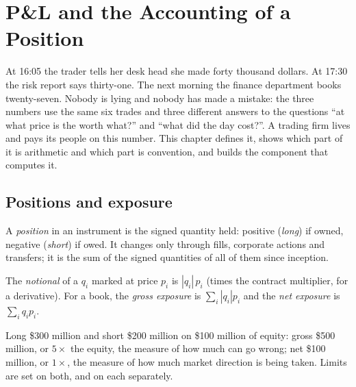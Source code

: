 \chapter{P\&L and the Accounting of a Position}\label{ch:m1:pnl-and-positions}

At 16:05 the trader tells her desk head she made forty thousand dollars. At
17:30 the risk report says thirty-one. The next morning the finance
department books twenty-seven. Nobody is lying and nobody has made a mistake:
the three numbers use the same six trades and three different answers to the
questions ``at what price is the  worth what?'' and ``what did the
day cost?''. A trading firm lives and pays its people on this number. This
chapter defines it, shows which part of it is arithmetic and which part is
convention, and builds the component that computes it.

\section{Positions and exposure}

\begin{definition}[Position]\label{def:m1:pnl-and-positions:position}
A \emph{position} in an instrument is the signed quantity
held: positive (\emph{long}) if owned, negative (\emph{short}) if owed. It
changes only through fills, corporate actions and transfers; it is the sum of
the signed quantities of all of them since inception.
\end{definition}

\begin{definition}\label{def:m1:pnl-and-positions:exposure}
The \emph{notional} of a  $q_i$ marked at price $p_i$
is $|q_i|\,p_i$ (times the contract multiplier, for a derivative). For a
book, the \emph{gross exposure} is $\sum_i |q_i| p_i$
and the \emph{net exposure} is $\sum_i q_i p_i$.
\end{definition}

\begin{example}\label{ex:m1:pnl-and-positions:book}
Long \$300 million and short \$200 million on \$100 million of equity: gross
\$500 million, or $5\times$ the equity, the measure of how much can go wrong;
net \$100 million, or $1\times$, the measure of how much market direction is
being taken. Limits are set on both, and on each  separately.
\end{example}

